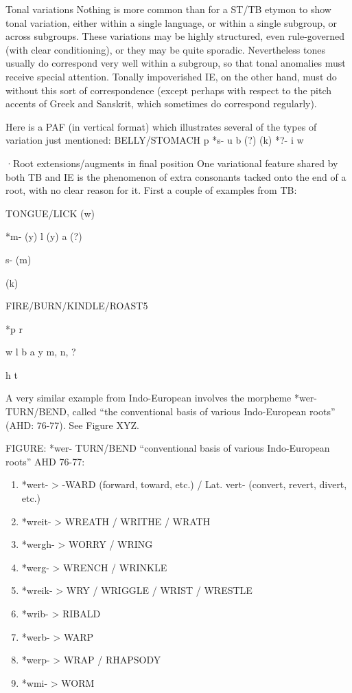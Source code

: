 Tonal variations
Nothing is more common than for a ST/TB etymon to show tonal variation, either within a single language, or within a single subgroup, or across subgroups.  These variations may be highly structured, even rule-governed (with clear conditioning), or they may be quite sporadic. Nevertheless tones usually do correspond very well within a subgroup, so that tonal anomalies must receive special attention. Tonally impoverished IE, on the other hand, must do without this sort of correspondence (except perhaps with respect to the pitch accents of Greek and Sanskrit, which sometimes do correspond regularly).

Here is a PAF (in vertical format) which illustrates several of the types of variation just mentioned:
BELLY/STOMACH
			p
		*s-		u
			b		(?)	(k)
		*?-		i
			w
	
·Root extensions/augments in final position
One variational feature shared by both TB and IE is the phenomenon of extra consonants tacked onto the end of a root, with no clear reason for it.  First a couple of examples from TB:

		
TONGUE/LICK
							(w)
	
		*m-
							(y)
			l	(y)	a	(?)	

		  s-					(m)

	
							(k)










FIRE/BURN/KINDLE/ROAST5

			*p			r

				w		l
			 b		a	
				y		m, n, ?
						
			 h			t


A very similar example from Indo-European involves the morpheme *wer- TURN/BEND, called “the conventional basis of various Indo-European roots” (AHD: 76-77). See Figure XYZ.

FIGURE: *wer- TURN/BEND  “conventional basis of various Indo-European roots”  AHD 76-77:

\begin{enumerate}
\item *wert-	>	-WARD	(forward, toward, etc.) / Lat. vert- (convert, revert, divert, etc.)

\item *wreit-	>	WREATH / WRITHE / WRATH

\item *wergh-	>	WORRY / WRING

\item *werg-	>	WRENCH / WRINKLE

\item *wreik-	>	WRY / WRIGGLE / WRIST / WRESTLE

\item *wrib-	>	RIBALD

\item *werb-	>	WARP

\item *werp-	>	WRAP / RHAPSODY

\item *wmi-	>	WORM
\end{enumerate}


